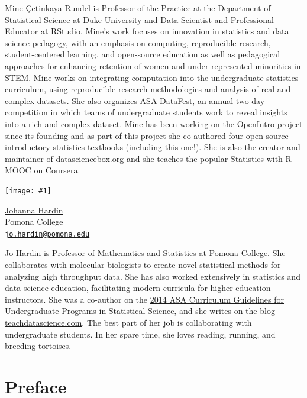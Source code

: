 \documentclass[
  10pt,
  openany]{book}
\newenvironment{authorinfo}[1]
  {
  \begin{minipage}[c]{0.30\textwidth}
  {\setkeys{Gin}{width=12em,keepaspectratio}\texttt{[image: \#1]}}
  \end{minipage} 
  \hfill
  \begin{minipage}[c]{0.60\textwidth}
  }
  {
  \end{minipage}
  }
\begin{document}
Mine Çetinkaya-Rundel is Professor of the Practice at the Department of Statistical Science at Duke University and Data Scientist and Professional Educator at RStudio.
Mine's work focuses on innovation in statistics and data science pedagogy, with an emphasis on computing, reproducible research, student-centered learning, and open-source education as well as pedagogical approaches for enhancing retention of women and under-represented minorities in STEM.
Mine works on integrating computation into the undergraduate statistics curriculum, using reproducible research methodologies and analysis of real and complex datasets.
She also organizes \href{https://ww2.amstat.org/education/datafest/}{ASA DataFest}, an annual two-day competition in which teams of undergraduate students work to reveal insights into a rich and complex dataset.
Mine has been working on the \href{openintro.org}{OpenIntro} project since its founding and as part of this project she co-authored four open-source introductory statistics textbooks (including this one!).
She is also the creator and maintainer of \href{https://datasciencebox.org/}{datasciencebox.org} and she teaches the popular Statistics with R MOOC on Coursera.
\newline

\begin{authorinfo}{images/authors/jo.png}
\href{https://research.pomona.edu/johardin/}{Johanna Hardin}\\
Pomona College\\
\href{mailto:jo.hardin@pomona.edu}{\nolinkurl{jo.hardin@pomona.edu}}

\end{authorinfo}

Jo Hardin is Professor of Mathematics and Statistics at Pomona College.
She collaborates with molecular biologists to create novel statistical methods for analyzing high throughput data.
She has also worked extensively in statistics and data science education, facilitating modern curricula for higher education instructors.
She was a co-author on the \href{https://www.amstat.org/asa/education/Curriculum-Guidelines-for-Undergraduate-Programs-in-Statistical-Science.aspx}{2014 ASA Curriculum Guidelines for Undergraduate Programs in Statistical Science}, and she writes on the blog \href{https://teachdatascience.com/}{teachdatascience.com}.
The best part of her job is collaborating with undergraduate students.
In her spare time, she loves reading, running, and breeding tortoises.

\hypertarget{preface}{%
\chapter*{Preface}\label{preface}}
\end{document}
